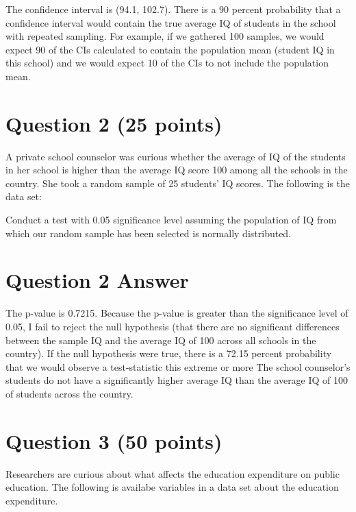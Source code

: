 \documentclass[12pt,letterpaper]{article}
\begin{document}
	\noindent The confidence interval is (94.1, 102.7). There is a 90 percent probability that a confidence interval would contain the true average IQ of students in the school with repeated sampling. For example, if we gathered 100 samples, we would expect 90 of the CIs calculated to contain the population mean (student IQ in this school) and we would expect 10 of the CIs to not include the population mean.
	
	\vspace{1cm}
	
	\section*{Question 2 (25 points)}
	A private school counselor was curious  whether  the average of IQ of the students in her school is higher than the average IQ score 100 among all the schools in the country. She took a random sample of 25 students' IQ scores. The following is the data set:
	\vspace{.5cm}
	  
	\vspace{.5cm}
	
	\noindent Conduct a test with 0.05 significance level assuming the population of IQ from which our random sample has been selected is normally distributed.
	 
	\section{Question 2 Answer}
	
	\noindent The p-value is 0.7215. Because the p-value is greater than the significance level of 0.05, I fail to reject the null hypothesis (that there are no significant differences between the sample IQ and the average IQ of 100 across all schools in the country). If the null hypothesis were true, there is a 72.15 percent probability that we would observe a test-statistic this extreme or more  The school counselor's students do not have a significantly higher average IQ than the average IQ of 100 of students across the country.
	
	\vspace{1cm}
	\section*{Question 3 (50 points)}
	
	\noindent Researchers are curious about what affects the education expenditure on public education. The following is availabe variables in a data set about the education expenditure. \\
	\vspace{.5cm}
	
\end{document}
